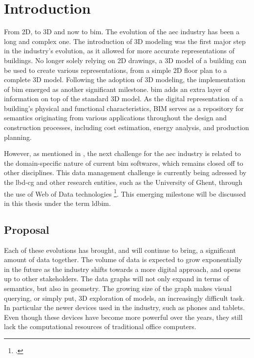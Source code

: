 \chapter{Introduction}
From 2D, to 3D and now to \acs{bim}. The evolution of the \ac{aec} industry has been a long and complex one. The introduction of 3D modeling was the first major step in the industry's evolution, as it allowed for more accurate representations of buildings. No longer solely relying on 2D drawings, a 3D model of a building can be used to create various representations, from a simple 2D floor plan to a complete 3D model. Following the adoption of 3D modeling, the implementation of \ac{bim} emerged as another significant milestone. \ac{bim} adds an extra layer of information on top of the standard 3D model. As the digital representation of a building's physical and functional characteristics, BIM serves as a repository for semantics originating from various applications throughout the design and construction processes, including cost estimation, energy analysis, and production planning.

\label{sec:intro}
However, as mentioned in \cite{Werbrouck2018}, the next challenge for the \ac{aec} industry is related to the domain-specific nature of current \ac{bim} softwares, which remains closed off to other disciplines. This data management challenge is currently being adressed by the \ac{lbd-cg} and other research entities, such as the University of Ghent, through the use of Web of Data technologies \footcite{ldbimGroup}. This emerging milestone will be discussed in this thesis under the term \ac{ldbim}.

\section{Proposal} \label{sec:proposal}
Each of these evolutions has brought, and will continue to bring, a significant amount of data together. The volume of data is expected to grow exponentially in the future as the industry shifts towards a more digital approach, and opens up to other stakeholders. The data graphs will not only expand in terms of semantics, but also in geometry. The growing size of the graph makes visual querying, or simply put, 3D exploration of models, an increasingly difficult task. In particular the newer devices used in the industry, such as phones and tablets. Even though these devices have become more powerful over the years, they still lack the computational resources of traditional office computers.

